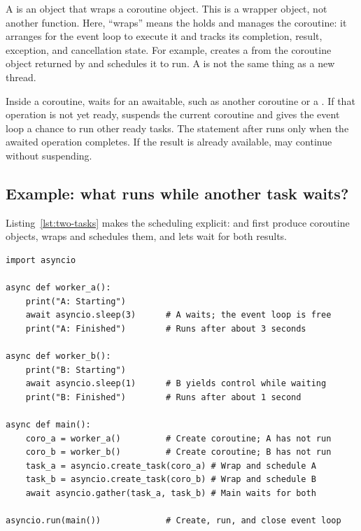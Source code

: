 A  is an  object that wraps a coroutine object. This is a wrapper object, not another function. Here, ``wraps'' means the  holds and manages the coroutine: it arranges for the event loop to execute it and tracks its completion, result, exception, and cancellation state. For example,  creates a  from the coroutine object returned by  and schedules it to run. A  is not the same thing as a new thread.

Inside a coroutine,  waits for an awaitable, such as another coroutine or a . If that operation is not yet ready,  suspends the current coroutine and gives the event loop a chance to run other ready tasks. The statement after  runs only when the awaited operation completes. If the result is already available,  may continue without suspending.

\subsection{Example: what runs while another task waits?}
Listing~\ref{lst:two-tasks} makes the scheduling explicit:  and  first produce coroutine objects,  wraps and schedules them, and  lets  wait for both results.

\begin{lstlisting}[caption={Two coroutines progressing concurrently on one event loop},label={lst:two-tasks}]
import asyncio

async def worker_a():
    print("A: Starting")
    await asyncio.sleep(3)      # A waits; the event loop is free
    print("A: Finished")        # Runs after about 3 seconds

async def worker_b():
    print("B: Starting")
    await asyncio.sleep(1)      # B yields control while waiting
    print("B: Finished")        # Runs after about 1 second

async def main():
    coro_a = worker_a()         # Create coroutine; A has not run
    coro_b = worker_b()         # Create coroutine; B has not run
    task_a = asyncio.create_task(coro_a) # Wrap and schedule A
    task_b = asyncio.create_task(coro_b) # Wrap and schedule B
    await asyncio.gather(task_a, task_b) # Main waits for both

asyncio.run(main())             # Create, run, and close event loop
\end{lstlisting}

